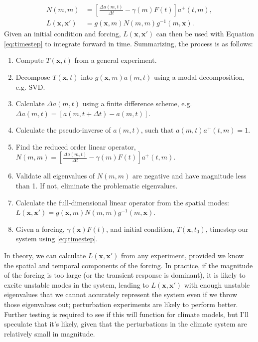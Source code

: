 \begin{align}
  N(m,m) &= \left[\frac{\Delta a(m,t)}{\Delta t} - \gamma(m)F(t) \right]a^+(t,m),\\
  L(\mathbf{x},\mathbf{x}') &= g(\mathbf{x},m)N(m,m)g^{-1}(m,\mathbf{x}).
\end{align}
Given an initial condition and forcing, $L(\mathbf{x},\mathbf{x}')$ can then be used with Equation \ref{eq:timestep} to integrate forward in time. Summarizing, the process is as follows:
\begin{enumerate}
  \item Compute $T(\mathbf{x},t)$ from a general experiment.
  \item Decompose $T(\mathbf{x},t)$ into $g(\mathbf{x},m)a(m,t)$ using a modal decomposition, e.g. SVD.
  \item Calculate $\Delta a(m,t)$ using a finite difference scheme, e.g. $\Delta a(m,t) = [a(m,t + \Delta t) - a(m,t)]$.
  \item Calculate the pseudo-inverse of $a(m,t)$, such that $a(m,t)a^+(t,m) = 1$.
  \item Find the reduced order linear operator, $N(m,m) = \left[\frac{\Delta a(m,t)}{\Delta t} - \gamma(m)F(t) \right]a^+(t,m)$.
  \item Validate all eigenvalues of $N(m,m)$ are negative and have magnitude less than 1. If not, eliminate the problematic eigenvalues.
  \item Calculate the full-dimensional linear operator from the spatial modes: $L(\mathbf{x},\mathbf{x}') = g(\mathbf{x},m)N(m,m)g^{-1}(m,\mathbf{x})$.
  \item Given a forcing, $\gamma(\mathbf{x})F(t)$, and initial condition, $T(\mathbf{x},t_0)$, timestep our system using \ref{eq:timestep}.
\end{enumerate}
In theory, we can calculate $L(\mathbf{x},\mathbf{x}')$ from any experiment, provided we know the spatial and temporal components of the forcing. In practice, if the magnitude of the forcing is too large (or the transient response is dominant), it is likely to excite unstable modes in the system, leading to $L(\mathbf{x},\mathbf{x}')$ with enough unstable eigenvalues that we cannot accurately represent the system even if we throw those eigenvalues out; perturbation experiments are likely to perform better. Further testing is required to see if this will function for climate models, but I'll speculate that it's likely, given that the perturbations in the climate system are relatively small in magnitude.

